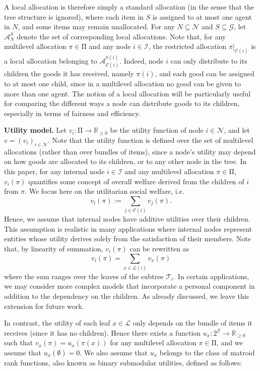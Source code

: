 \documentclass[]{article}
\newcommand{\tree}{\mathcal{T}}
\newcommand{\nodes}{\mathcal{N}}
\newcommand{\items}{\mathcal{G}}
\newcommand{\children}{\mathcal{C}}
\newcommand{\leaves}{\mathcal{L}}
\newcommand{\internal}{\mathcal{I}}
\newcommand{\mallocations}{\mathrm{\Pi}}
\newcommand{\allocations}{\mathcal{A}}
\begin{document}
\noindent A local allocation is therefore simply a standard allocation (in the sense that the tree structure is ignored), where each item in $S$ is assigned to at most one agent in 
$N$, and some items may remain unallocated. For any $N  \subseteq  \nodes$ and $S  \subseteq  \items$, let $\mathcal{A}^S_N$ denote the set of corresponding local allocations. Note that, for any multilevel allocation $\pi \in \mallocations$ and any node $i \in \internal$, the restricted allocation $\pi |_{\children(i)}$ is a local allocation belonging to $\allocations^{\pi(i)}_{\children(i)}$. Indeed, node $i$ can only distribute to its children the goods it has received, namely $\pi(i)$, and each good can be assigned to at most one child, since in a multilevel allocation no good can be given to more than one agent. The notion of a local allocation will be particularly useful for comparing the different ways a node can distribute goods to its children, especially in terms of fairness and efficiency.

\medskip

\noindent \textbf{Utility model.} Let $v_i : \mallocations \rightarrow \mathbb{R}_{\geq 0}$ be the utility function of node $i  \in  \nodes$, and let $v =(v_i)_{i \in \nodes}$. Note that the utility function is defined over the set of multilevel allocations (rather than over bundles of items), since a node’s utility may depend on how goods are allocated to its children, or to any other node in the tree. In this paper, for any internal node $i \in \internal$ and any multilevel allocation $\pi \in \mallocations$, $v_i(\pi)$ quantifies some concept of overall welfare derived from the children of $i$ from $\pi $.  We focus here on the utilitarian social welfare, i.e. $$
v_i(\pi) := \sum_{j \in \children(i)} v_{j}(\pi).
$$ 
Hence, we assume that internal nodes have additive utilities over their children. This assumption is realistic in many applications where internal nodes represent entities whose utility derives solely from the satisfaction of their members. Note that, by linearity of summation, $v_i(\pi)$ can be rewritten as $$v_i(\pi) = \sum_{x \in \leaves(i)} v_x(\pi)$$ where the sum ranges over the leaves of the subtree $\tree_i$. In certain applications, we may consider more complex models that incorporate a personal component in addition to the dependency on the children. As already discussed, we leave this extension for future work.

In contrast, the utility of each leaf $x \in \leaves$ only depends on the bundle of items it receives (since it has no children). Hence there exists a function $u_x : 2^\items \rightarrow \mathbb{R}_{\geq 0}$ such that $v_x(\pi) = u_x(\pi(x))$ for any multilevel allocation $\pi \in \mallocations$, and we assume that $u_x(\emptyset) = 0$. We also assume that $u_x$ belongs to the class of matroid rank functions, also known as binary submodular utilities, defined as follows:
\end{document}
